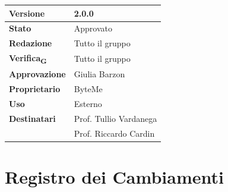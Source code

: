 \documentclass[11pt,a4paper]{article}
\newcommand{\gls}[1]{#1\textsubscript{G}}
\begin{document}
\begin{titlepage}
    \begin{table}[H]
        \centering
        \begin{tabular}{|l|p{5cm}|}
            \hline
            \textbf{Versione} & 2.0.0\\
            \hline
            \textbf{Stato} & Approvato \\
            \hline
            \textbf{Redazione} & Tutto il gruppo \\
            \hline
            \textbf{\gls{Verifica}} & Tutto il gruppo \\
            \hline
            \textbf{Approvazione} & Giulia Barzon\\
            \hline
            \textbf{Proprietario} & ByteMe \\
            \hline
            \textbf{Uso} & Esterno \\
            \hline
            \textbf{Destinatari} & Prof. Tullio Vardanega \\ & Prof. Riccardo Cardin \\
            \hline
        \end{tabular}
    \end{table}
    
    \vfill
\end{titlepage}

\thispagestyle{empty}
\section*{Registro dei Cambiamenti}
\end{document}

